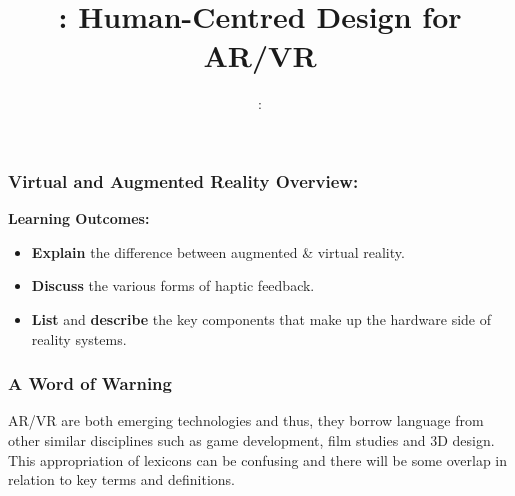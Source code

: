 \usepackage{../../beamerthemeFalmouthGamesAcademy}
\usepackage{multimedia}
\usepackage{soul}
\usepackage{tikz}
\usepackage{verbatim}
\graphicspath{ {../../} }


\usepackage[normalem]{ulem}
\usepackage{wasysym}

\usepackage{pdfpages}

\usetikzlibrary{arrows,automata}




\title{\sessionnumber: \normalsize{Human-Centred Design for AR/VR}}
\subtitle{\modulecode: \moduletitle}

\frame{\titlepage} 

\begin{frame}
	\frametitle{Virtual and Augmented Reality Overview:}
	
	\textbf{Learning Outcomes:}
	
	\begin{itemize}
		\item \textbf{Explain} the difference between augmented \& virtual reality. 
		\item \textbf{Discuss} the various forms of haptic feedback.
		\item \textbf{List} and \textbf{describe} the key components that make up the hardware side of reality systems.	
	\end{itemize}
\end{frame}

\begin{frame}
	\frametitle{A Word of Warning}
	AR/VR are both emerging technologies and thus, they borrow language from other similar disciplines such as game development, film studies and 3D design. This appropriation of lexicons can be confusing and there will be some overlap in relation to key terms and definitions.
\end{frame}

